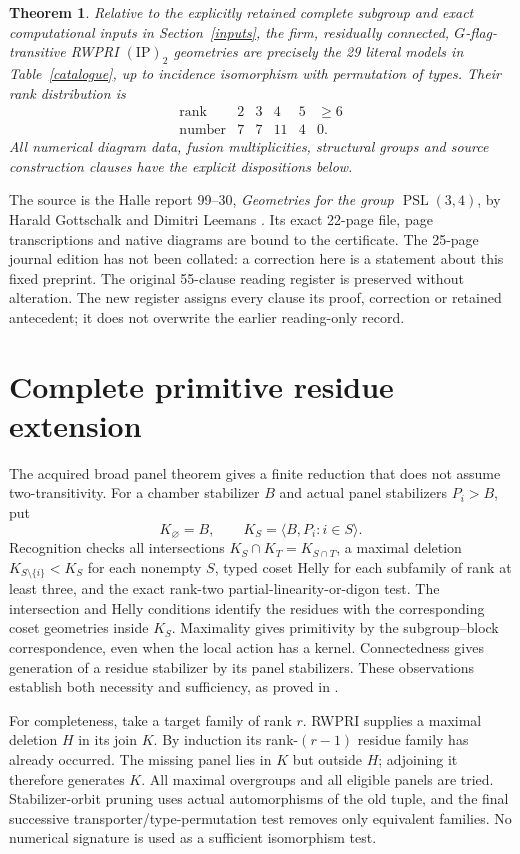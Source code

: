 \documentclass[11pt]{article}
\newtheorem{theorem}{Theorem}\newtheorem{proposition}[theorem]{Proposition}
\newcommand{\PSL}{\operatorname{PSL}}\newcommand{\PG}{\operatorname{PG}}
\newcommand{\ip}{\mathrm{(IP)}_2}
\begin{document}
\begin{theorem}\label{main}
Relative to the explicitly retained complete subgroup and exact
computational inputs in Section~\ref{inputs}, the firm, residually
connected, $G$-flag-transitive RWPRI $\ip$ geometries are precisely the
29 literal models in Table~\ref{catalogue}, up to incidence isomorphism
with permutation of types. Their rank distribution is
\[
\begin{array}{c|rrrrr}
\text{rank}&2&3&4&5&\geq6\\\hline
\text{number}&7&7&11&4&0.
\end{array}
\]
All numerical diagram data, fusion multiplicities, structural groups and
source construction clauses have the explicit dispositions below.
\end{theorem}

The source is the Halle report 99--30, \emph{Geometries for the group
$\PSL(3,4)$}, by Harald Gottschalk and Dimitri Leemans \cite{GL}.
Its exact 22-page file, page transcriptions and native diagrams are
bound to the certificate. The 25-page journal edition has not been
collated: a correction here is a statement about this fixed preprint.
The original 55-clause reading register is preserved without alteration.
The new register assigns every clause its proof, correction or retained
antecedent; it does not overwrite the earlier reading-only record.

\section{Complete primitive residue extension}\label{exhaust}
The acquired broad panel theorem \cite{Panel} gives a finite reduction
that does not assume two-transitivity. For a chamber stabilizer $B$
and actual panel stabilizers $P_i>B$, put
\[
 K_\varnothing=B,\qquad K_S=\langle B,P_i:i\in S\rangle.
\]
Recognition checks all intersections
$K_S\cap K_T=K_{S\cap T}$, a maximal deletion
$K_{S\setminus\{i\}}<K_S$ for each nonempty $S$, typed coset Helly
for each subfamily of rank at least three, and the exact rank-two
partial-linearity-or-digon test. The intersection and Helly conditions
identify the residues with the corresponding coset geometries inside
$K_S$. Maximality gives primitivity by the subgroup--block correspondence,
even when the local action has a kernel. Connectedness gives generation
of a residue stabilizer by its panel stabilizers. These observations
establish both necessity and sufficiency, as proved in \cite{Panel}.

For completeness, take a target family of rank $r$. RWPRI supplies a
maximal deletion $H$ in its join $K$. By induction its rank-$(r-1)$
residue family has already occurred. The missing panel lies in $K$
but outside $H$; adjoining it therefore generates $K$. All maximal
overgroups and all eligible panels are tried. Stabilizer-orbit pruning
uses actual automorphisms of the old tuple, and the final successive
transporter/type-permutation test removes only equivalent families.
No numerical signature is used as a sufficient isomorphism test.
\end{document}

